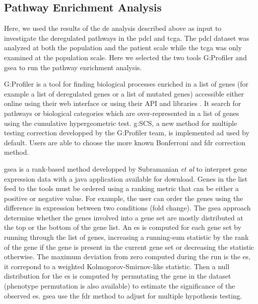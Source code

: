 \subsection{Pathway Enrichment Analysis}

Here, we used the results of the \acrlong{de} analysis described above as input to investigate the deregulated pathways in the \acrshort{pdcl} and \acrshort{tcga}.
The \acrlong{pdcl} dataset was analyzed at both the population and the patient scale while the \acrshort{tcga} was only examined at the population scale.
Here we selected the two tools G:Profiler and \acrfull{gsea} to run the pathway enrichment analysis.

G:Profiler is a tool for finding biological processes enriched in a list of genes (for example a list of deregulated genes or a list of mutated genes) accessible either online using their web interface or using their API and libraries \cite*{Raudvere2019}.
It search for pathways or biological categories which are over-represented in a list of genes using the cumulative hypergeometric test.
g:SCS, a new method for multiple testing correction developped by the G:Profiler team, is implemented ad used by default.
Users are able to choose the more known Bonferroni and \acrshort{fdr} correction method.

\acrfull{gsea} is a rank-based method developped by Subramanian \textit{et al} to interpret gene expression data with a java application available for download.
Genes in the list feed to the tools must be ordered using a ranking metric that can be either a positive or negative value.
For example, the user can order the genes using the difference in expression between two conditions (fold change).
The \acrshort{gsea} approach determine whether the genes involved into a gene set are mostly distributed at the top or the bottom of the gene list.
An \acrfull{es} is computed for each gene set by running through the list of genes, increasing a running-sum statistic by the rank of the gene if the gene is present in the current gene set or decreasing the statistic otherwise.
The maximum deviation from zero computed during the run is the \acrshort{es}, it correpond to a weighted Kolmogorov-Smirnov-like statistic.
Then a null distribution for the \acrshort{es} is computed by permutating the gene in the dataset (phenotype permutation is also available) to estimate the significance of the observed \acrshort{es}.
\acrshort{gsea} use the \acrshort{fdr} method to adjust for multiple hypothesis testing.

